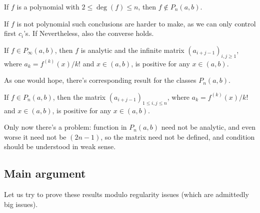 \begin{prop}
	If $f$ is a polynomial with $2 \leq \deg(f) \leq n$, then $f \notin P_{n}(a, b)$.
\end{prop}

If $f$ is not polynomial such conclusions are harder to make, as we can only control first $c_{i}$'s. If Nevertheless, also the converse holds.

\begin{lause}\label{heuristic_loewner}
	If $f \in P_{\infty}(a, b)$, then $f$ is analytic and the infinite matrix $(a_{i + j - 1})_{i, j \geq 1}$, where $a_{k} = f^{(k)}(x)/k!$ and $x \in (a, b)$, is positive for any $x \in (a, b)$.
\end{lause}

As one would hope, there's corresponding result for the classes $P_{n}(a, b)$.

\begin{lause}\label{heuristic_main}
	If $f \in P_{n}(a, b)$, then the matrix $(a_{i + j - 1})_{1 \leq i, j \leq n}$, where $a_{k} = f^{(k)}(x)/k!$ and $x \in (a, b)$, is positive for any $x \in (a, b)$.
\end{lause}

Only now there's a problem: function in $P_{n}(a, b)$ need not be analytic, and even worse it need not be $(2 n - 1)$, so the matrix need not be defined, and condition should be understood in weak sense.

\subsection{Main argument}

Let us try to prove these results modulo regularity issues (which are admittedly big issues).

